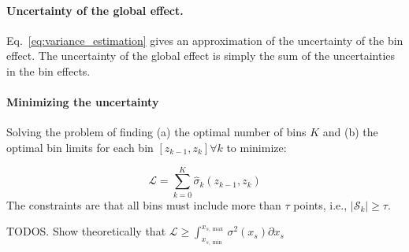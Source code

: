 \documentclass[twoside]{article}
\begin{document}
\paragraph{Uncertainty of the global effect.}

Eq.~\eqref{eq:variance_estimation} gives an approximation of the
uncertainty of the bin effect.
The uncertainty of the global effect is
simply the sum of the uncertainties in the bin effects.

\paragraph{Minimizing the uncertainty}

Solving the problem of finding (a) the optimal number of bins \(K\) and (b) the optimal bin limits for each bin \([z_{k-1}, z_k] \forall k\) to minimize:

\begin{equation}
  \label{eq:1}
  \mathcal{L} = \sum_{k=0}^K \hat{\sigma}_k(z_{k-1}, z_k)
\end{equation}
%
The constraints are that all bins must include more than \(\tau\)
points, i.e., \(|\mathcal{S}_k| \geq \tau\).

\noindent
TODOS. Show theoretically that \(\mathcal{L} \geq \int_{x_{s, \min}}^{x_{s, \max}}\sigma^2(x_s) \partial x_s\)


\end{document}
